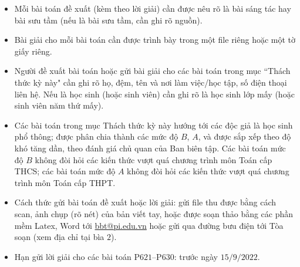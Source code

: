 \thispagestyle{thachthuctoanhocnone}
\pagestyle{thachthuctoanhoc}
\everymath{\color{thachthuctoanhoc}}
\graphicspath{{../thachthuctoanhoc/pic/}}
\begingroup
{}
\centering
\vspace*{4cm}
\endgroup
\vspace*{-8pt}
\begin{tBox}
	\begin{itemize}[leftmargin = 13pt, itemsep = 1.0pt] 
		\item Mỗi bài toán đề xuất (kèm theo lời giải) cần được nêu rõ là bài sáng tác hay bài sưu tầm (nếu là bài sưu tầm, cần ghi rõ nguồn).
		\item Bài giải cho mỗi bài toán cần được trình bày trong một file riêng hoặc
		một tờ giấy riêng.
		\item  Người đề xuất bài toán hoặc gửi bài giải cho các bài toán trong mục ``Thách thức kỳ này" cần ghi rõ họ, đệm, tên và nơi làm việc/học tập, số điện thoại liên hệ. Nếu là học sinh (hoặc sinh viên) cần ghi rõ là học sinh lớp mấy (hoặc sinh viên năm thứ mấy).
		\item Các bài toán trong mục Thách thức kỳ này hướng tới các độc giả là học sinh phổ thông; được phân chia thành các mức độ $B$, $A$, và được sắp xếp theo độ khó tăng dần, theo đánh giá chủ quan của Ban biên tập. Các bài toán mức độ $B$ không đòi hỏi các kiến thức vượt quá chương trình môn Toán cấp THCS; các bài toán mức độ $A$ không đòi hỏi các kiến thức vượt quá chương trình môn Toán cấp THPT.
		\item Cách thức gửi bài toán đề xuất hoặc lời giải: gửi file thu được bằng cách scan, ảnh chụp (rõ nét) của bản viết tay, hoặc được soạn thảo bằng các phần mềm Latex, Word tới \url{bbt@pi.edu.vn} hoặc gửi qua đường bưu điện tới Tòa soạn (xem địa chỉ tại bìa $2$).
		\item Hạn gửi lời giải cho các bài toán P$621$--P$630$: trước ngày $15/9/2022$.
	\end{itemize}
\end{tBox}
